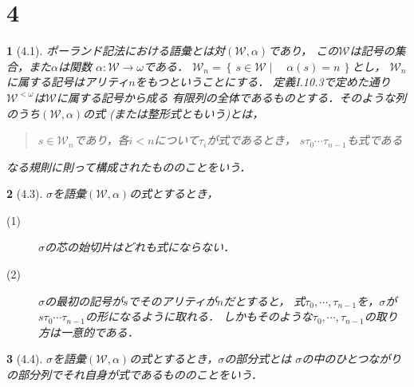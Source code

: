 \documentclass[a4j,10.5pt,oneside,openany]{jsbook}
\theoremstyle{mystyle}
\newtheorem{thm}{\color{DarkMidnightBlue}{定理}}[section]
\newtheorem{dfn}[thm]{\color{PakistanGreen}{定義}}
\newcommand{\Set}[2]{\left\{\, #1 \mid \quad #2\, \right\}} %
\begin{document}
\section{4}
	\begin{screen}
		\begin{dfn}[4.1]
			ポーランド記法における語彙とは対$(\mathcal{W},\alpha)$であり，
			この$\mathcal{W}$は記号の集合，また$\alpha$は関数
			$\alpha:\mathcal{W} \rightarrow \omega$である．
			$\mathcal{W}_{n} = \Set{s \in \mathcal{W}}{\alpha(s) = n}$とし，
			$\mathcal{W}_{n}$に属する記号はアリティ$n$をもつということにする．
			定義I.10.3で定めた通り$\mathcal{W}^{<\omega}$は$\mathcal{W}$に属する記号から成る
			有限列の全体であるものとする．そのような列のうち$(\mathcal{W},\alpha)$の式
			(または整形式ともいう)とは，
			\begin{center}
				\begin{quote}
					$s \in \mathcal{W}_{n}$であり，各$i < n$について$\tau_{i}$が式であるとき，
					$s\tau_{0}\cdots\tau_{n-1}$も式である
				\end{quote}
			\end{center}
			なる規則に則って構成されたもののことをいう．
		\end{dfn}
	\end{screen}
	
	\begin{screen}
		\begin{thm}[4.3]
			$\sigma$を語彙$(\mathcal{W},\alpha)$の式とするとき，
			\begin{description}
				\item[(1)] $\sigma$の芯の始切片はどれも式にならない．
				\item[(2)] $\sigma$の最初の記号が$s$でそのアリティが$n$だとすると，
					式$\tau_{0},\cdots,\tau_{n-1}$を，$\sigma$が
					$s\tau_{0}\cdots\tau_{n-1}$の形になるように取れる．
					しかもそのような$\tau_{0},\cdots,\tau_{n-1}$の取り方は一意的である．
			\end{description}
		\end{thm}
	\end{screen}
	
	\begin{screen}
		\begin{dfn}[4.4]
			$\sigma$を語彙$(\mathcal{W},\alpha)$の式とするとき，$\sigma$の部分式とは
			$\sigma$の中のひとつながりの部分列でそれ自身が式であるもののことをいう．
		\end{dfn}
	\end{screen}
	
\end{document}
